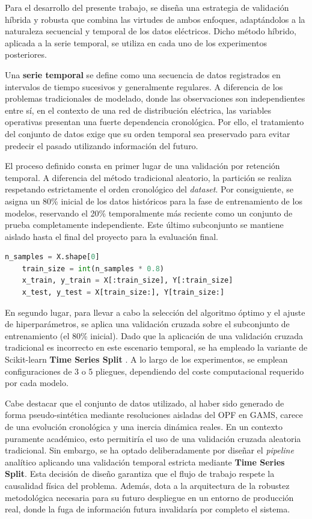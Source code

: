 Para el desarrollo del presente trabajo, se diseña una estrategia de validación híbrida y robusta que combina las virtudes de ambos enfoques, adaptándolos a la naturaleza secuencial y temporal de los datos eléctricos. Dicho método híbrido, aplicada a la serie temporal, se utiliza en cada uno de los experimentos posteriores.

Una \textbf{serie temporal} se define como una secuencia de datos registrados en intervalos de tiempo sucesivos y generalmente regulares. A diferencia de los problemas tradicionales de modelado, donde las observaciones son independientes entre sí, en el contexto de una red de distribución eléctrica, las variables operativas presentan una fuerte dependencia cronológica. Por ello, el tratamiento del conjunto de datos exige que su orden temporal sea preservado para evitar predecir el pasado utilizando información del futuro.

El proceso definido consta en primer lugar de una validación por retención temporal. A diferencia del método tradicional aleatorio, la partición se realiza respetando estrictamente el orden cronológico del \textit{dataset}. Por consiguiente, se asigna un 80\% inicial de los datos históricos para la fase de entrenamiento de los modelos, reservando el 20\% temporalmente más reciente como un conjunto de prueba completamente independiente. Este último subconjunto se mantiene aislado hasta el final del proyecto para la evaluación final.
\begin{lstlisting}[language=Python, caption={Código de validación por retención}, label={cod:validacion_retencion}, captionpos=b]
	n_samples = X.shape[0]
	train_size = int(n_samples * 0.8)
	x_train, y_train = X[:train_size], Y[:train_size]
	x_test, y_test = X[train_size:], Y[train_size:]
\end{lstlisting}

En segundo lugar, para llevar a cabo la selección del algoritmo óptimo y el ajuste de hiperparámetros, se aplica una validación cruzada sobre el subconjunto de entrenamiento (el 80\% inicial). Dado que la aplicación de una validación cruzada tradicional es incorrecto en este escenario temporal, se ha empleado la variante de Scikit-learn \textbf{Time Series Split} \cite{scikit-learn-time-series}. A lo largo de los experimentos, se emplean configuraciones de 3 o 5 pliegues, dependiendo del coste computacional requerido por cada modelo.

Cabe destacar que el conjunto de datos utilizado, al haber sido generado de forma pseudo-sintética mediante resoluciones aisladas del OPF en GAMS, carece de una evolución cronológica y una inercia dinámica reales. En un contexto puramente académico, esto permitiría el uso de una validación cruzada aleatoria tradicional. Sin embargo, se ha optado deliberadamente por diseñar el \textit{pipeline} analítico aplicando una validación temporal estricta mediante \textbf{Time Series Split}. Esta decisión de diseño garantiza que el flujo de trabajo respete la causalidad física del problema. Además, dota a la arquitectura de la robustez metodológica necesaria para su futuro despliegue en un entorno de producción real, donde la fuga de información futura invalidaría por completo el sistema.

